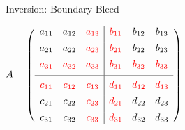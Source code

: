 \begin{frame}{Inversion: Boundary Bleed}

  \centering \small
  \vspace{0.5em}
  $A =
  \left(
    \begin{array}{ccc|ccc}
      a_{11} & a_{12} & \textcolor{red}{a_{13}} &
      \textcolor{red}{b_{11}} & b_{12} & b_{13} \\[0.5em]
      a_{21} & a_{22} & \textcolor{red}{a_{23}} &
      \textcolor{red}{b_{21}} & b_{22} & b_{23} \\[0.5em]
      \textcolor{red}{a_{31}} & \textcolor{red}{a_{32}} &
      \textcolor{red}{a_{33}} & \textcolor{red}{b_{31}} &
      \textcolor{red}{b_{32}} & \textcolor{red}{b_{33}} \\[0.5em]
      \hline
      \rule{0pt}{1.2em}
      \textcolor{red}{c_{11}} & \textcolor{red}{c_{12}} &
      \textcolor{red}{c_{13}} & \textcolor{red}{d_{11}} &
      \textcolor{red}{d_{12}} & \textcolor{red}{d_{13}} \\[0.5em]
      c_{21} & c_{22} & \textcolor{red}{c_{23}} &
      \textcolor{red}{d_{21}} & d_{22} & d_{23} \\[0.5em]
      c_{31} & c_{32} & \textcolor{red}{c_{33}} &
      \textcolor{red}{d_{31}} & d_{32} & d_{33}
  \end{array} \right)$
  \vspace{0.5em}

\end{frame}

